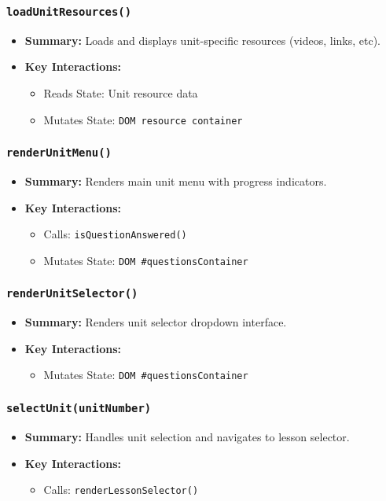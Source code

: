 \documentclass[11pt,letterpaper]{article}
\begin{document}
\subsubsection{\texttt{loadUnitResources()}}
\begin{itemize}
    \item \textbf{Summary:} Loads and displays unit-specific resources (videos, links, etc).
    \item \textbf{Key Interactions:}
    \begin{itemize}
        \item Reads State: Unit resource data
        \item Mutates State: \texttt{DOM resource container}
    \end{itemize}
\end{itemize}

\subsubsection{\texttt{renderUnitMenu()}}
\begin{itemize}
    \item \textbf{Summary:} Renders main unit menu with progress indicators.
    \item \textbf{Key Interactions:}
    \begin{itemize}
        \item Calls: \texttt{isQuestionAnswered()}
        \item Mutates State: \texttt{DOM \#questionsContainer}
    \end{itemize}
\end{itemize}

\subsubsection{\texttt{renderUnitSelector()}}
\begin{itemize}
    \item \textbf{Summary:} Renders unit selector dropdown interface.
    \item \textbf{Key Interactions:}
    \begin{itemize}
        \item Mutates State: \texttt{DOM \#questionsContainer}
    \end{itemize}
\end{itemize}

\subsubsection{\texttt{selectUnit(unitNumber)}}
\begin{itemize}
    \item \textbf{Summary:} Handles unit selection and navigates to lesson selector.
    \item \textbf{Key Interactions:}
    \begin{itemize}
        \item Calls: \texttt{renderLessonSelector()}
    \end{itemize}
\end{itemize}
\end{document}
